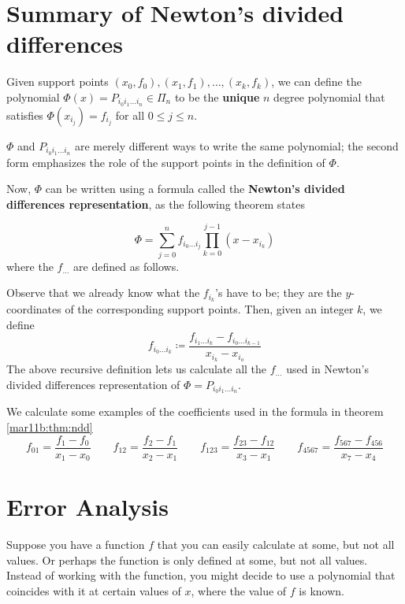 
\section{Summary of Newton's divided differences}

\begin{defn}
  Given support points $(x_0, f_0), (x_1, f_1), \dots ,(x_k, f_k)$, we can define the polynomial $\Phi(x) = P_{i_0i_1\dots i_n} \in \Pi_n$ to be the \textbf{unique} $n$ degree polynomial that satisfies $\Phi(x_{i_j}) = f_{i_j}$ for all $0 \leq j \leq n$.
\end{defn}
\begin{rmk}
  $\Phi$ and $P_{i_0i_1\dots i_n}$ are merely different ways to write the same polynomial; the second form emphasizes the role of the support points in the definition of $\Phi$.
\end{rmk}

 Now, $\Phi$ can be written using a formula called the \textbf{Newton's divided differences representation}, as the following theorem states
 \begin{thm}
   \label{mar11b:thm:ndd}
  \[
    \Phi = \sum_{j = 0}^n f_{i_0\dots i_j}\prod_{k = 0}^{j-1}\left(x - x_{i_k}\right)
  \]
  where the $f_{\dots}$ are defined as follows.

  Observe that we already know what the $f_{i_k}$'s have to be; they are the $y$-coordinates of the corresponding support points.
  Then, given an integer $k$, we define
  \[
    f_{i_0\dots i_{k}} \coloneqq \frac{f_{i_1\dots i_{k}} - f_{i_0\dots i_{k-1}}}{x_{i_k} - x_{i_o}}
  \]
  The above recursive definition lets us calculate all the $f_{\dots}$ used in Newton's divided differences representation of $\Phi = P_{i_0i_1\dots i_n}$.
\end{thm}

\begin{example}
  We calculate some examples of the coefficients used in the formula in theorem \ref{mar11b:thm:ndd}
  \[
    f_{01} = \frac{f_1 - f_0}{x_1 - x_0}
    \qquad
    f_{12} = \frac{f_2 - f_1}{x_2 - x_1}
    \qquad
    f_{123} = \frac{f_{23} - f_{12}}{x_3 - x_1}
    \qquad
    f_{4567} = \frac{f_{567} - f_{456}}{x_7 - x_4}
  \]
\end{example}

\section{Error Analysis}
Suppose you have a function $f$ that you can easily calculate at some, but not all values. Or perhaps the function is only defined at some, but not all values. Instead of working with the function, you might decide to use a polynomial that coincides with it at certain values of $x$, where the value of $f$ is known.

